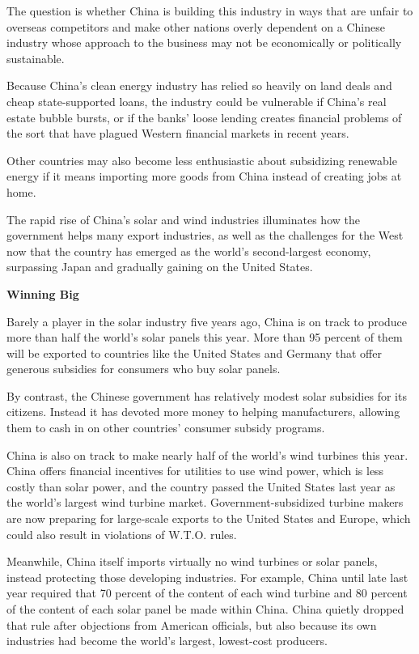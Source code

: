 ﻿\documentclass[12pt]{article}
\begin{document}
The question is whether China is building this industry in ways that are unfair to overseas
competitors and make other nations overly dependent on a Chinese industry whose approach to the
business may not be economically or politically sustainable.

Because China's clean energy industry has relied so heavily on land deals and cheap state-supported
loans, the industry could be vulnerable if China's real estate bubble bursts, or if the banks' loose
lending creates financial problems of the sort that have plagued Western financial markets in recent
years.

Other countries may also become less enthusiastic about subsidizing renewable energy if it means
importing more goods from China instead of creating jobs at home.

The rapid rise of China's solar and wind industries illuminates how the government helps many export
industries, as well as the challenges for the West now that the country has emerged as the world's
second-largest economy, surpassing Japan and gradually gaining on the United States.

\textbf{Winning Big}

Barely a player in the solar industry five years ago, China is on track to produce more than half
the world's solar panels this year. More than 95 percent of them will be exported to countries like
the United States and Germany that offer generous subsidies for consumers who buy solar panels.

By contrast, the Chinese government has relatively modest solar subsidies for its citizens. Instead
it has devoted more money to helping manufacturers, allowing them to cash in on other countries'
consumer subsidy programs.

China is also on track to make nearly half of the world's wind turbines this year. China offers
financial incentives for utilities to use wind power, which is less costly than solar power, and the
country passed the United States last year as the world's largest wind turbine market.
Government-subsidized turbine makers are now preparing for large-scale exports to the United States
and Europe, which could also result in violations of W.T.O. rules.

Meanwhile, China itself imports virtually no wind turbines or solar panels, instead protecting those
developing industries. For example, China until late last year required that 70 percent of the
content of each wind turbine and 80 percent of the content of each solar panel be made within China.
China quietly dropped that rule after objections from American officials, but also because its own
industries had become the world's largest, lowest-cost producers.
\end{document}
